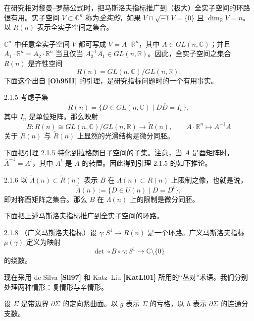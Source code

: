 在研究相对黎曼--罗赫公式时，把马斯洛夫指标推广到（极大）全实子空间的环路很有用。实子空间
$V\subset\mathbb C^n$ 称为\emph{全实的}，如果
$V\cap\sqrt{-1}V=\{0\}$ 且 $\dim_{\mathbb R}V=n$。以 $R(n)$ 表示全实子空间之集合。

$\mathbb C^n$ 中任意全实子空间 $V$ 都可写成
$V=A\cdot\mathbb R^n$，其中 $A\in GL(n,\mathbb C)$；并且
$A_1\cdot\mathbb R^n=A_2\cdot\mathbb R^n$ 当且仅当
$A_2^{-1}A_1\in GL(n,\mathbb R)$。因此，全实子空间之集合 $R(n)$ 是齐性空间
\[
  R(n)=GL(n,\mathbb C)/GL(n,\mathbb R).
\]
下面这个出自 \textbf{[Oh95II]} 的引理，是研究指标问题时的一个有用事实。

\begin{lemma}{2.1.5}\label{lem:2-1-5}
考虑子集
\[
  \widetilde R(n)
  =\{D\in GL(n,\mathbb C)\mid D\overline D=I_n\},
\]
其中 $I_n$ 是单位矩阵。那么映射
\[
  B:R(n)\cong GL(n,\mathbb C)/GL(n,\mathbb R)
  \longrightarrow\widetilde R(n),
  \qquad A\cdot\mathbb R^n\longmapsto A^{-1}\overline A
\]
关于 $R(n)$ 与 $\widetilde R(n)$ 上显然的光滑结构是微分同胚。
\end{lemma}

下面把引理 2.1.5 特化到拉格朗日子空间的子集。注意，当 $A$ 是酉矩阵时，
$\overline A^{-1}=A^t$，其中 $A^t$ 是 $A$ 的转置。因此得到引理 2.1.5 的如下推论。

\begin{corollary}{2.1.6}\label{cor:2-1-6}
以 $\widetilde\Lambda(n)\subset\widetilde R(n)$ 表示 $B$ 在
$\Lambda(n)\subset R(n)$ 上限制之像，也就是说，
\begin{equation}
  \widetilde\Lambda(n)
  :=\{D\in U(n)\mid D=D^t\},
  \tag{2.1.7}\label{eq:2-1-7}
\end{equation}
即对称酉矩阵之集合。那么 $B$ 在 $\Lambda(n)$ 上的限制是微分同胚。
\end{corollary}

下面把上述马斯洛夫指标推广到全实子空间的环路。

\begin{definition}{2.1.8}\label{def:2-1-8}
（广义马斯洛夫指标）设 $\gamma:S^1\to R(n)$ 是一个环路。广义马斯洛夫指标
$\mu(\gamma)$ 定义为映射
\[
  \det\circ B\circ\gamma:S^1\longrightarrow\mathbb C\setminus\{0\}
\]
的绕数。
\end{definition}

现在采用 de Silva \textbf{[Sil97]} 和 Katz--Liu \textbf{[KatLi01]} 所用的“丛对”术语。我们分别处理两种情形：复情形与辛情形。

设 $\Sigma$ 是带边界 $\partial\Sigma$ 的定向紧曲面。以 $g$ 表示 $\Sigma$ 的亏格，以
$h$ 表示 $\partial\Sigma$ 的连通分支数。


